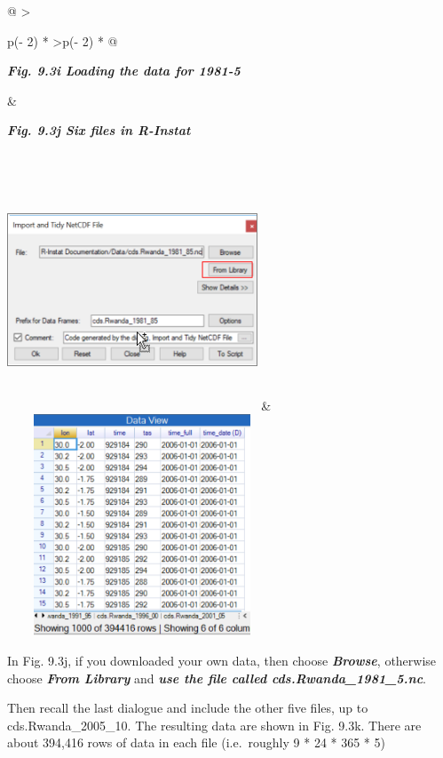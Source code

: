 \documentclass[
  letterpaper,
  DIV=11,
  numbers=noendperiod]{scrreprt}
\begin{document}
\begin{longtable}[]{@{}
  >{\raggedright\arraybackslash}p{(\columnwidth - 2\tabcolsep) * }
  >{\raggedleft\arraybackslash}p{(\columnwidth - 2\tabcolsep) * }@{}}
\toprule\noalign{}
\begin{minipage}[b]{\linewidth}\raggedright
\textbf{\emph{Fig. 9.3i Loading the data for 1981-5}}
\end{minipage} & \begin{minipage}[b]{\linewidth}\raggedleft
\textbf{\emph{Fig. 9.3j Six files in R-Instat}}
\end{minipage} \\
\midrule\noalign{}
\endhead
\bottomrule\noalign{}
\endlastfoot
\includegraphics[width=2.93324in,height=2.8244in]{figures/Fig9.3i.png} &
\includegraphics[width=3.16845in,height=2.59489in]{figures/Fig9.3j.png} \\
\end{longtable}

In Fig. 9.3j, if you downloaded your own data, then choose
\textbf{\emph{Browse}}, otherwise choose \textbf{\emph{From Library}}
and \textbf{\emph{use the file called cds.Rwanda\_1981\_5.nc}}.

Then recall the last dialogue and include the other five files, up to
cds.Rwanda\_2005\_10. The resulting data are shown in Fig. 9.3k. There
are about 394,416 rows of data in each file (i.e.~roughly 9 * 24 * 365 *
5)
\end{document}
